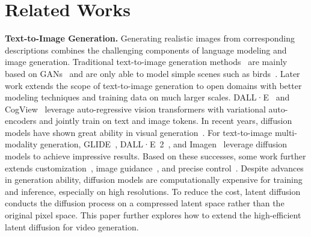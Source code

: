 \documentclass{article}
\begin{document}
\section{Related Works}
\label{sec:related_works}

\noindent\textbf{Text-to-Image Generation.}
Generating realistic images from corresponding descriptions combines the challenging components of language modeling and image generation.
Traditional text-to-image generation methods~\cite{2016T2I,ICML_16,AttnGAN,StackGAN,AI_Illustrator} are mainly based on GANs~\cite{GAN} and are only able to model simple scenes such as birds~\cite{WahCUB_200_2011}.
Later work extends the scope of text-to-image generation to open domains with better modeling techniques and training data on much larger scales.
DALL·E~\cite{dalle} and CogView~\cite{cogview} leverage auto-regressive vision transformers with variational auto-encoders and jointly train on text and image tokens.
In recent years, diffusion models have shown great ability in visual generation~\cite{2021ADM}.
For text-to-image multi-modality generation, GLIDE~\cite{2021GLIDE}, DALL·E~2~\cite{2022DALLE2}, and Imagen~\cite{imagen} leverage diffusion models to achieve impressive results. 
Based on these successes, some work further extends customization~\cite{2022DreamBooth,UnifiedMMLD2023}, image guidance~\cite{2023PaintbyExample}, and precise control~\cite{2022eDiff-I}.
Despite advances in generation ability, diffusion models are computationally expensive for training and inference, especially on high resolutions.
To reduce the cost, latent diffusion~\cite{2022LDM} conducts the diffusion process on a compressed latent space rather than the original pixel space.
This paper further explores how to extend the high-efficient latent diffusion for video generation.
\end{document}
